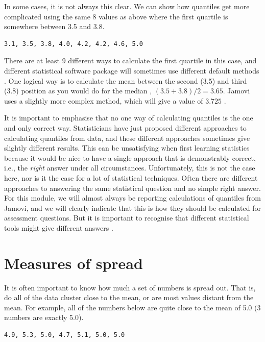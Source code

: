 \documentclass[
]{scrbook}
\begin{document}
In some cases, it is not always this clear.
We can show how quantiles get more complicated using the same 8 values as above where the first quartile is somewhere between 3.5 and 3.8.

\begin{verbatim}
3.1, 3.5, 3.8, 4.0, 4.2, 4.2, 4.6, 5.0
\end{verbatim}

There are at least 9 different ways to calculate the first quartile in this case, and different statistical software package will sometimes use different default methods \citep{Hyndman1996}.
One logical way is to calculate the mean between the second (3.5) and third (3.8) position as you would do for the median \citep{Rowntree2018}, \((3.5 + 3.8) / 2 = 3.65\).
Jamovi uses a slightly more complex method, which will give a value of \(3.725\) \citep{Jamovi2022}.

It is important to emphasise that no one way of calculating quantiles is the one and only correct way.
Statisticians have just proposed different approaches to calculating quantiles from data, and these different approaches sometimes give slightly different results.
This can be unsatisfying when first learning statistics because it would be nice to have a single approach that is demonstrably correct, i.e., the \emph{right} answer under all circumstances.
Unfortunately, this is not the case here, nor is it the case for a lot of statistical techniques.
Often there are different approaches to answering the same statistical question and no simple right answer.
For this module, we will almost always be reporting calculations of quantiles from Jamovi, and we will clearly indicate that this is how they should be calculated for assessment questions.
But it is important to recognise that different statistical tools might give different answers \citep{Hyndman1996}.

\hypertarget{Chapter_12}{%
\chapter{Measures of spread}\label{Chapter_12}}

It is often important to know how much a set of numbers is spread out.
That is, do all of the data cluster close to the mean, or are most values distant from the mean.
For example, all of the numbers below are quite close to the mean of 5.0 (3 numbers are exactly 5.0).

\begin{verbatim}
4.9, 5.3, 5.0, 4.7, 5.1, 5.0, 5.0
\end{verbatim}
\end{document}
